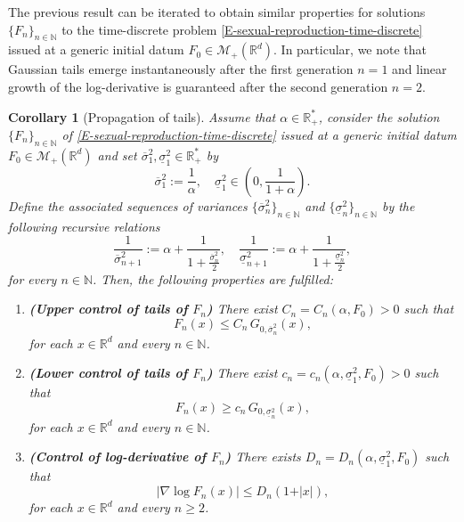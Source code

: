 \documentclass[reqno]{amsart}
\newtheorem{corollary}[definition]{Corollary}
\numberwithin{equation}{section}
\begin{document}
{The previous result can be iterated to obtain similar properties for solutions $\{F_n\}_{n\in \mathbb{N}}$ to the time-discrete problem \eqref{E-sexual-reproduction-time-discrete} issued at a generic initial datum $F_0\in \mathcal{M}_+(\mathbb{R}^d)$. In particular, we note that Gaussian tails emerge instantaneously after the first generation $n=1$ and linear growth of the log-derivative is guaranteed after the second generation $n=2$.

\begin{corollary}[Propagation of tails]\label{C-sexual-reproduction-Gaussian-tails}
Assume that $\alpha\in \mathbb{R}_+^*$, consider the solution $\{F_n\}_{n\in \mathbb{N}}$ of \eqref{E-sexual-reproduction-time-discrete} issued at a generic initial datum $F_0\in \mathcal{M}_+(\mathbb{R}^d)$ and set $\overline{\sigma}^2_1,\underline{\sigma}^2_1\in \mathbb{R}_+^*$ by
$$\overline{\sigma}^2_1:=\frac{1}{\alpha},\quad \underline{\sigma}^2_1\in \left(0,\frac{1}{1+\alpha}\right).$$
Define the associated sequences of variances $\{\overline{\sigma}_n^2\}_{n\in \mathbb{N}}$ and $\{\underline{\sigma}_n^2\}_{n\in \mathbb{N}}$ by the following recursive relations
\begin{equation}\label{E-variances-barriers}
\frac{1}{\overline{\sigma}_{n+1}^2}:=\alpha+\frac{1}{1+\frac{\overline{\sigma}^2_n}{2}},\quad \frac{1}{\underline{\sigma}_{n+1}^2}:=\alpha+\frac{1}{1+\frac{\underline{\sigma}^2_n}{2}},
\end{equation}
for every $n\in \mathbb{N}$. Then, the following properties are fulfilled:
\begin{enumerate}
\item {\bf (Upper control of tails of $F_n$)} There exist $C_n=C_n(\alpha,F_0)>0$ such that
\begin{equation}\label{E-sexual-reproduction-evolution-upper-bound-Gaussian}
F_n(x)\leq C_n\,G_{0,\overline{\sigma}_n^2}(x),
\end{equation}
for each $x\in \mathbb{R}^d$ and every $n\in \mathbb{N}$.
\item {\bf (Lower control of tails of $F_n$)} There exist $c_n=c_n(\alpha,\underline{\sigma}_1^2,F_0)>0$ such that
\begin{equation}\label{E-sexual-reproduction-evolution-lower-bound-Gaussian}
F_n(x)\geq c_n\,G_{0,\underline{\sigma}_n^2}(x),
\end{equation}
for each $x\in \mathbb{R}^d$ and every $n\in \mathbb{N}$.
\item {\bf (Control of log-derivative of $F_n$)} There exists $D_n=D_n(\alpha,\underline{\sigma}_1^2,F_0)$ such that
\begin{equation}\label{E-sexual-reproduction-evolution-log-derivative}
\vert \nabla\log F_n(x)\vert\leq D_n(1+\vert x\vert),
\end{equation}
for each $x\in \mathbb{R}^d$ and every $n\geq 2$.
\end{enumerate}
\end{corollary}

}
\end{document}
